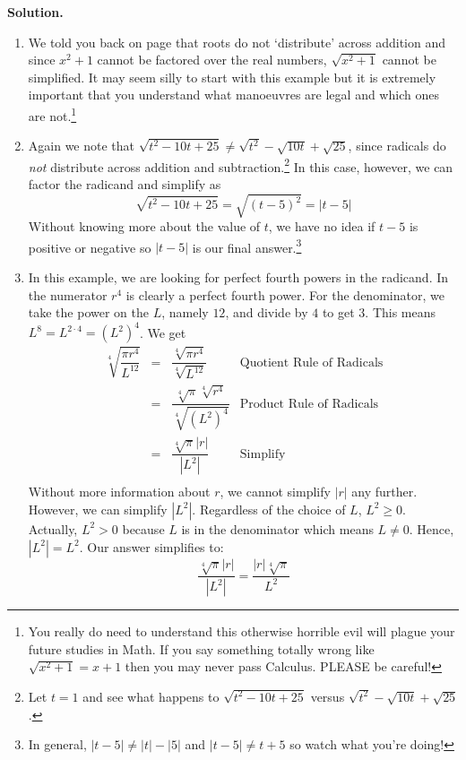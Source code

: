 \documentclass[10pt]{article}
\begin{document}
\begin{ex}
{\bf Solution.}

\begin{enumerate}

\item We told you back on page \pageref{donotdistributeexponents} that roots do not `distribute' across addition and since $x^{2} + 1$ cannot be factored over the real numbers, $\sqrt{x^{2} + 1}$ cannot be simplified.  It may seem silly to start with this example but it is extremely important that you understand what manoeuvres are legal and which ones are not.\footnote{You really do need to understand this otherwise horrible evil will plague your future studies in Math.  If you say something totally wrong like $\sqrt{x^{2} + 1} = x + 1$ then you may never pass Calculus.  PLEASE be careful!}

\item Again we note that $\sqrt{t^2-10t+25}  \neq \sqrt{t^2} - \sqrt{10t} + \sqrt{25}$, since radicals do \textit{not} distribute across addition and subtraction.\footnote{Let $t = 1$ and see what happens to $\sqrt{t^2-10t+25}$  versus $\sqrt{t^2} - \sqrt{10t} + \sqrt{25}$.}  In this case, however, we can factor the radicand and simplify as \[ \sqrt{t^2 - 10t + 25} = \sqrt{(t-5)^2} = |t-5| \]
Without knowing more about the value of $t$, we have no idea if $t-5$ is positive or negative so $|t-5|$ is our final answer.\footnote{In general,  $|t-5| \neq |t| - |5|$ and  $|t-5| \neq t + 5$ so watch what you're doing!}


\item  In this example, we are looking for perfect fourth powers in the radicand.  In the numerator $r^4$ is clearly a perfect fourth power.  For the denominator, we take the power on the $L$, namely $12$, and divide by $4$ to get $3$.  This means $L^{8} = L^{2\cdot 4} = (L^2)^{4}$.  We get \[ \begin{array}{rclr}

\sqrt[4]{\dfrac{\pi r^{4}}{L^{12}}} & = & \dfrac{\sqrt[4]{\pi r^{4}}}{\sqrt[4]{L^{12}}} & \text{Quotient Rule of Radicals} \\ [12pt]

                                    & = & \dfrac{\sqrt[4]{\pi}\sqrt[4]{r^{4}}}{\sqrt[4]{(L^2)^{4}}} & \text{Product Rule of Radicals} \\ [12pt]
																		& = & \dfrac{\sqrt[4]{\pi}|r|}{|L^2|} & \text{Simplify} \\
																	
\end{array}\]  Without more information about $r$, we cannot simplify $|r|$ any further.  However, we can simplify $|L^2|$.  Regardless of the choice of $L$, $L^2 \geq 0$. Actually, $L^2 > 0$ because $L$ is in the denominator which means $L \neq 0$. Hence, $|L^2| = L^2$.  Our answer simplifies to: \[ \dfrac{\sqrt[4]{\pi}|r|}{|L^2|} = \dfrac{|r|\sqrt[4]{\pi}}{L^2} \]


\end{enumerate}
\end{ex}
\end{document}
